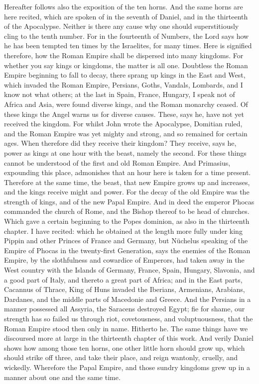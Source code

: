 Hereafter follows also the exposition of the ten horns. And the same horns are here recited, which are spoken of in the seventh of Daniel, and in the thirteenth of the Apocalypse. Neither is there any cause why one should superstitiously cling to the tenth number. For in the fourteenth of Numbers, the Lord says how he has been tempted ten times by the Israelites, for many times. Here is signified therefore, how the Roman Empire shall be dispersed into many kingdoms. For whether you say kings or kingdoms, the matter is all one. Doubtless the Roman Empire beginning to fall to decay, there sprang up kings in the East and West, which invaded the Roman Empire, Persians, Goths, Vandals, Lombards, and I know not what others; at the last in Spain, France, Hungary, I speak not of Africa and Asia, were found diverse kings, and the Roman monarchy ceased. Of these kings the Angel warns us for diverse causes. These, says he, have not yet received the kingdom. For whilst John wrote the Apocalypse, Domitian ruled, and the Roman Empire was yet mighty and strong, and so remained for certain ages. When therefore did they receive their kingdom? They receive, says he, power as kings at one hour with the beast, namely the second. For these things cannot be understood of the first and old Roman Empire. And Primasius, expounding this place, admonishes that an hour here is taken for a time present. Therefore at the same time, the beast, that new Empire grows up and increases, and the kings receive might and power. For the decay of the old Empire was the strength of kings, and of the new Papal Empire. And in deed the emperor Phocas commanded the church of Rome, and the Bishop thereof to be head of churches. Which gave a certain beginning to the Popes dominion, as also in the thirteenth chapter. I have recited: which he obtained at the length more fully under king Pippin and other Princes of France and Germany, but Nüchelus speaking of the Empire of Phocas in the twenty-first Generation, says the enemies of the Roman Empire, by the slothfulness and cowardice of Emperors, had taken away in the West country with the Islands of Germany, France, Spain, Hungary, Slavonia, and a good part of Italy, and thereto a great part of Africa; and in the East parts, Cacannus of Thrace, King of Huns invaded the Iberians, Armenians, Arabians, Dardanes, and the middle parts of Macedonie and Greece. And the Persians in a manner possessed all Assyria, the Saracens destroyed Egypt; fie for shame, our strength has so failed us through riot, covetousness, and voluptuousness, that the Roman Empire stood then only in name. Hitherto he. The same things have we discoursed more at large in the thirteenth chapter of this work. And verily Daniel shows how among those ten horns, one other little horn should grow up, which should strike off three, and take their place, and reign wantonly, cruelly, and wickedly. Wherefore the Papal Empire, and those sundry kingdoms grew up in a manner about one and the same time.

